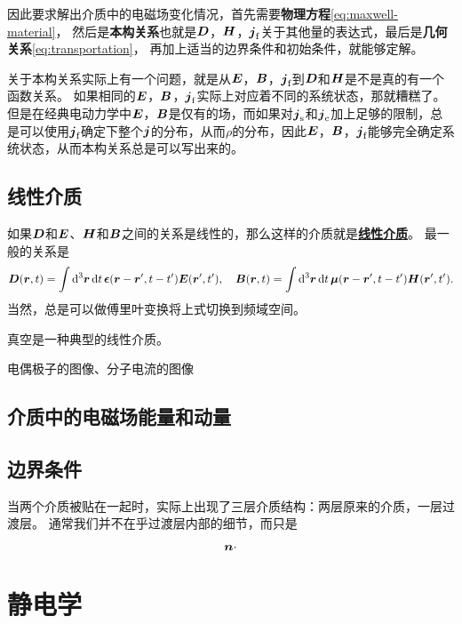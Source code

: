 \documentclass[UTF8, a4paper]{ctexart}
\renewcommand{\emph}[1]{\textbf{#1}}
\newcommand*{\concept}[1]{\underline{\textbf{#1}}}
\begin{document}
因此要求解出介质中的电磁场变化情况，首先需要\emph{物理方程}\eqref{eq:maxwell-material}，
然后是\emph{本构关系}也就是$\vb*{D}$，$\vb*{H}$，$\vb*{j}_\text{f}$关于其他量的表达式，最后是\emph{几何关系}\eqref{eq:transportation}，
再加上适当的边界条件和初始条件，就能够定解。

关于本构关系实际上有一个问题，就是从$\vb*{E}$，$\vb*{B}$，$\vb*{j}_\text{f}$到$\vb*{D}$和$\vb*{H}$是不是真的有一个函数关系。
如果相同的$\vb*{E}$，$\vb*{B}$，$\vb*{j}_\text{f}$实际上对应着不同的系统状态，那就糟糕了。
但是在经典电动力学中$\vb*{E}$，$\vb*{B}$是仅有的场，而如果对$\vb*{j}_\text{s}$和$\vb*{j}_\text{c}$加上足够的限制，总是可以使用$\vb*{j}_\text{f}$确定下整个$\vb*{j}$的分布，从而$\rho$的分布，因此$\vb*{E}$，$\vb*{B}$，$\vb*{j}_\text{f}$能够完全确定系统状态，从而本构关系总是可以写出来的。

\subsection{线性介质}

如果$\vb*{D}$和$\vb*{E}$、$\vb*{H}$和$\vb*{B}$之间的关系是线性的，那么这样的介质就是\concept{线性介质}。
最一般的关系是
\begin{equation}
    \vb*{D}(\vb*{r}, t) = \int \dd[3]{\vb*{r}} \dd{t} \vb*{\epsilon}(\vb*{r} - \vb*{r}', t - t') \vb*{E}(\vb*{r}', t'), \quad
    \vb*{B}(\vb*{r}, t) = \int \dd[3]{\vb*{r}} \dd{t} \vb*{\mu}(\vb*{r} - \vb*{r}', t - t') \vb*{H}(\vb*{r}', t').
\end{equation}
当然，总是可以做傅里叶变换将上式切换到频域空间。

真空是一种典型的线性介质。

电偶极子的图像、分子电流的图像

\subsection{介质中的电磁场能量和动量}

\subsection{边界条件}

当两个介质被贴在一起时，实际上出现了三层介质结构：两层原来的介质，一层过渡层。
通常我们并不在乎过渡层内部的细节，而只是

\begin{equation}
    \vb*{n} \cdot 
\end{equation}

\section{静电学}
\end{document}
